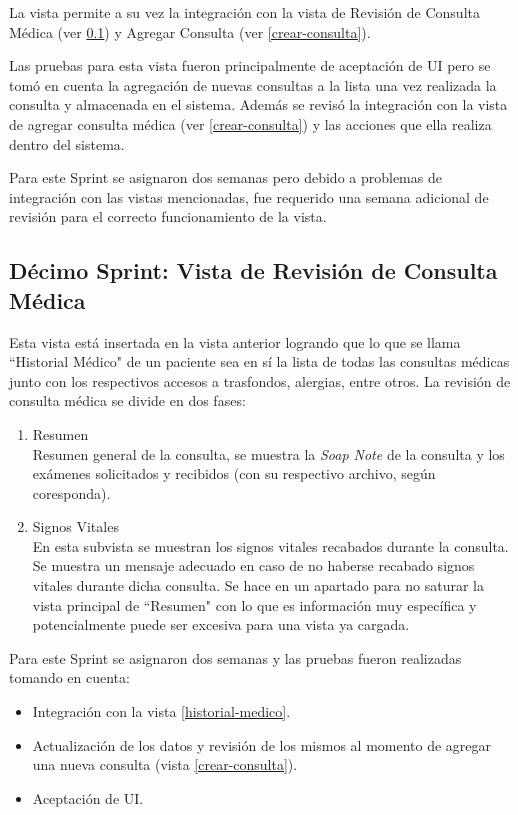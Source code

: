     La vista permite a su vez la integración con la vista de Revisión de Consulta Médica (ver \ref{revisar-consulta}) y Agregar Consulta (ver \ref{crear-consulta}).
    
    Las pruebas para esta vista fueron principalmente de aceptación de UI pero se tomó en cuenta la agregación de nuevas consultas a la lista una vez realizada la consulta y almacenada en el sistema. Además se revisó la integración con la vista de agregar consulta médica (ver \ref{crear-consulta}) y las acciones que ella realiza dentro del sistema.
    
    Para este Sprint se asignaron dos semanas pero debido a problemas de integración con las vistas mencionadas, fue requerido una semana adicional de revisión para el correcto funcionamiento de la vista.
    
    \subsection{Décimo Sprint: Vista de Revisión de Consulta Médica}
    \label{revisar-consulta}
    Esta vista está insertada en la vista anterior logrando que lo que se llama ``Historial Médico" de un paciente sea en sí la lista de todas las consultas médicas junto con los respectivos accesos a trasfondos, alergias, entre otros. La revisión de consulta médica se divide en dos fases:
    
    \begin{enumerate}
        \item Resumen\\
        Resumen general de la consulta, se muestra la \textit{Soap Note} de la consulta y los exámenes solicitados y recibidos (con su respectivo archivo, según coresponda).
        \item Signos Vitales\\
        En esta subvista se muestran los signos vitales recabados durante la consulta. Se muestra un mensaje adecuado en caso de no haberse recabado signos vitales durante dicha consulta. Se hace en un apartado para no saturar la vista principal de ``Resumen" con lo que es información muy específica y potencialmente puede ser excesiva para una vista ya cargada.
    \end{enumerate}
    
    Para este Sprint se asignaron dos semanas y las pruebas fueron realizadas tomando en cuenta:
    
    \begin{itemize}
        \item Integración con la vista \ref{historial-medico}.
        \item Actualización de los datos y revisión de los mismos al momento de agregar una nueva consulta (vista \ref{crear-consulta}).
        \item Aceptación de UI.
    \end{itemize}
    
